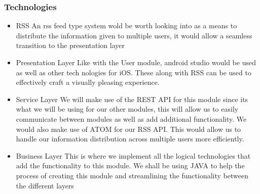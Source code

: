 \documentclass{article}
\begin{document}
			\subsubsection{Technologies}
				\begin{itemize}
				\item	RSS
				An rss feed type system wold be worth looking into as a means to distribute the information given to multiple users, it would allow a seamless transition to the presentation layer
				\item Presentation Layer
				Like with the User module, android studio would be used as well as other tech nologies for iOS. These along with RSS can be used to effectively craft a visually pleasing experience.

				\item Service Layer
				We will make use of the REST API for this module since its what we will be using for our other modules, this will allow us to easily communicate between modules as well as add additional functionality. We would also make use of ATOM for our RSS API. This would allow us to handle our information distribution across multiple users more efficiently.

				\item Business Layer
				This is where we implement all the logical technologies that add the functionality to this module. We shall be using JAVA to help the process of creating this module and streamlining the functionality between the different layers
				\end{itemize}
			
\end{document}
